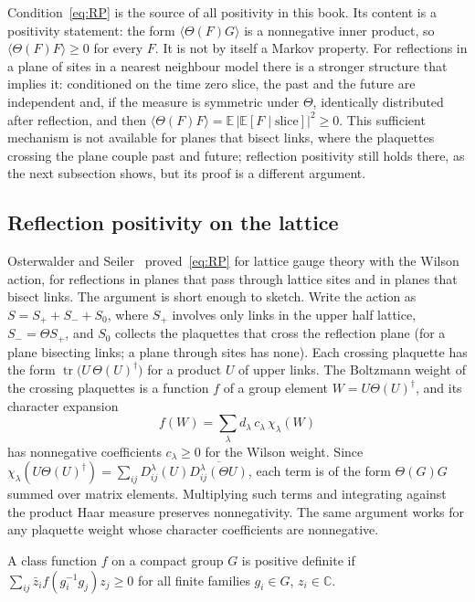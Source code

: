 Condition~\eqref{eq:RP} is the source of all positivity in this book. Its content is a positivity statement: the form $\langle\Theta(F)G\rangle$ is a nonnegative inner product, so $\langle\Theta(F)F\rangle\ge0$ for every $F$. It is not by itself a Markov property. For reflections in a plane of sites in a nearest neighbour model there is a stronger structure that implies it: conditioned on the time zero slice, the past and the future are independent and, if the measure is symmetric under $\Theta$, identically distributed after reflection, and then $\langle\Theta(F)F\rangle=\mathbb E\,|\mathbb E[F\mid\text{slice}]|^2\ge0$. This sufficient mechanism is not available for planes that bisect links, where the plaquettes crossing the plane couple past and future; reflection positivity still holds there, as the next subsection shows, but its proof is a different argument.

\subsection{Reflection positivity on the lattice}\label{sec:rplattice}

Osterwalder and Seiler~\cite{OSe} proved~\eqref{eq:RP} for lattice gauge theory with the Wilson action, for reflections in planes that pass through lattice sites and in planes that bisect links. The argument is short enough to sketch. Write the action as $S=S_++S_-+S_0$, where $S_+$ involves only links in the upper half lattice, $S_-=\Theta S_+$, and $S_0$ collects the plaquettes that cross the reflection plane (for a plane bisecting links; a plane through sites has none). Each crossing plaquette has the form $\operatorname{tr}\big(U\,\Theta(U)^\dagger\big)$ for a product $U$ of upper links. The Boltzmann weight of the crossing plaquettes is a function $f$ of a group element $W=U\Theta(U)^\dagger$, and its character expansion
\[
f(W)=\sum_\lambda d_\lambda\,c_\lambda\,\chi_\lambda(W)
\]
has nonnegative coefficients $c_\lambda\ge0$ for the Wilson weight. Since $\chi_\lambda(U\Theta(U)^\dagger)=\sum_{ij}D^\lambda_{ij}(U)\overline{D^\lambda_{ij}(\Theta U)}$, each term is of the form $\Theta(G)G$ summed over matrix elements. Multiplying such terms and integrating against the product Haar measure preserves nonnegativity. The same argument works for any plaquette weight whose character coefficients are nonnegative.

\begin{definition}
A class function $f$ on a compact group $G$ is positive definite if $\sum_{ij}\bar z_if(g_i^{-1}g_j)z_j\ge0$ for all finite families $g_i\in G$, $z_i\in\mathbb C$.
\end{definition}

